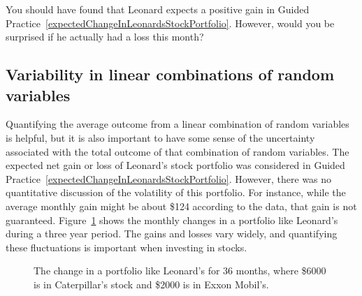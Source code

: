 \begin{exercisewrap}
\begin{nexercise}
You should have found that Leonard expects a positive gain
in Guided Practice~\ref{expectedChangeInLeonardsStockPortfolio}.
However, would you be surprised if he actually had
a loss this month?\footnotemark
\end{nexercise}
\end{exercisewrap}


\D{\newpage}

\subsection{Variability in linear combinations of random variables}
\label{var_lin_combo_of_RVs}

Quantifying the average outcome from a linear combination
of random variables is helpful, but it is also important
to have some sense of the uncertainty associated with
the total outcome of that combination of random variables.
The expected net gain or loss of Leonard's stock portfolio
was considered in Guided Practice~\ref{expectedChangeInLeonardsStockPortfolio}.
However, there was no quantitative discussion of the
volatility of this portfolio.
For instance, while the average monthly gain might be
about \$124 according to the data, that gain is not guaranteed.
Figure~\ref{changeInLeonardsStockPortfolioFor36Months}
shows the monthly changes in a portfolio like Leonard's during
a three year period.
The gains and losses vary widely, and quantifying these
fluctuations is important when investing in stocks.

\begin{figure}[ht]
\centering
{}
\caption{The change in a portfolio like Leonard's for 36 months,
    where \$6000 is in Caterpillar's stock and \$2000 is in
    Exxon Mobil's.}
\label{changeInLeonardsStockPortfolioFor36Months}
\end{figure}


